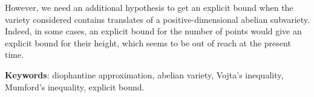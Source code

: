 \documentclass[final, cover]{mpg-preth}
\begin{document}
However, we need an additional hypothesis to get an explicit bound when the
variety considered contains translates of a positive-dimensional abelian
subvariety. Indeed, in some cases, an explicit bound for the number of points
would give an explicit bound for their height, which seems to be out of reach
at the present time.

\medskip\noindent
\textbf{Keywords}: diophantine approximation, abelian variety, Vojta's
inequality, \mbox{Mumford}'s inequality, explicit bound.
\end{document}
